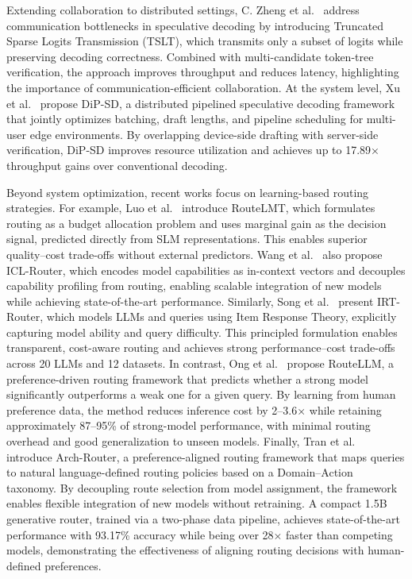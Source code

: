 \documentclass[lettersize,journal]{IEEEtran}
\begin{document}
Extending collaboration to distributed settings, C. Zheng et al.~\cite{CZheng2026} address communication bottlenecks in speculative decoding by introducing Truncated Sparse Logits Transmission (TSLT), which transmits only a subset of logits while preserving decoding correctness. Combined with multi-candidate token-tree verification, the approach improves throughput and reduces latency, highlighting the importance of communication-efficient collaboration. At the system level, Xu et al.~\cite{Xu2026} propose DiP-SD, a distributed pipelined speculative decoding framework that jointly optimizes batching, draft lengths, and pipeline scheduling for multi-user edge environments. By overlapping device-side drafting with server-side verification, DiP-SD improves resource utilization and achieves up to 17.89× throughput gains over conventional decoding.

Beyond system optimization, recent works focus on learning-based routing strategies. For example, Luo et al.~\cite{Luo2026} introduce RouteLMT, which formulates routing as a budget allocation problem and uses marginal gain as the decision signal, predicted directly from SLM representations. This enables superior quality–cost trade-offs without external predictors. Wang et al.~\cite{Wang2026} also propose ICL-Router, which encodes model capabilities as in-context vectors and decouples capability profiling from routing, enabling scalable integration of new models while achieving state-of-the-art performance. Similarly, Song et al.~\cite{Song2025} present IRT-Router, which models LLMs and queries using Item Response Theory, explicitly capturing model ability and query difficulty. This principled formulation enables transparent, cost-aware routing and achieves strong performance–cost trade-offs across 20 LLMs and 12 datasets. In contrast, Ong et al.~\cite{Ong2025} propose RouteLLM, a preference-driven routing framework that predicts whether a strong model significantly outperforms a weak one for a given query. By learning from human preference data, the method reduces inference cost by 2–3.6× while retaining approximately 87–95\% of strong-model performance, with minimal routing overhead and good generalization to unseen models. Finally, Tran et al.~\cite{Tran2025} introduce Arch-Router, a preference-aligned routing framework that maps queries to natural language-defined routing policies based on a Domain–Action taxonomy. By decoupling route selection from model assignment, the framework enables flexible integration of new models without retraining. A compact 1.5B generative router, trained via a two-phase data pipeline, achieves state-of-the-art performance with 93.17\% accuracy while being over 28× faster than competing models, demonstrating the effectiveness of aligning routing decisions with human-defined preferences.
\end{document}
